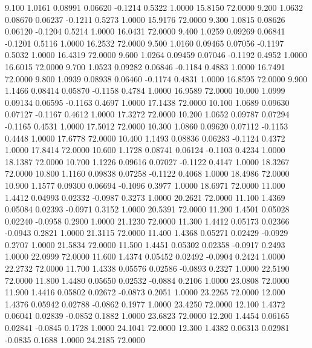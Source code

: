    9.100   1.0161   0.08991   0.06620  -0.1214   0.5322   1.0000  15.8150  72.0000
   9.200   1.0632   0.08670   0.06237  -0.1211   0.5273   1.0000  15.9176  72.0000
   9.300   1.0815   0.08626   0.06120  -0.1204   0.5214   1.0000  16.0431  72.0000
   9.400   1.0259   0.09269   0.06841  -0.1201   0.5116   1.0000  16.2532  72.0000
   9.500   1.0160   0.09465   0.07056  -0.1197   0.5032   1.0000  16.4319  72.0000
   9.600   1.0264   0.09459   0.07046  -0.1192   0.4952   1.0000  16.6015  72.0000
   9.700   1.0523   0.09282   0.06846  -0.1184   0.4883   1.0000  16.7491  72.0000
   9.800   1.0939   0.08938   0.06460  -0.1174   0.4831   1.0000  16.8595  72.0000
   9.900   1.1466   0.08414   0.05870  -0.1158   0.4784   1.0000  16.9589  72.0000
  10.000   1.0999   0.09134   0.06595  -0.1163   0.4697   1.0000  17.1438  72.0000
  10.100   1.0689   0.09630   0.07127  -0.1167   0.4612   1.0000  17.3272  72.0000
  10.200   1.0652   0.09787   0.07294  -0.1165   0.4531   1.0000  17.5012  72.0000
  10.300   1.0860   0.09620   0.07112  -0.1153   0.4448   1.0000  17.6778  72.0000
  10.400   1.1493   0.08836   0.06283  -0.1124   0.4372   1.0000  17.8414  72.0000
  10.600   1.1728   0.08741   0.06124  -0.1103   0.4234   1.0000  18.1387  72.0000
  10.700   1.1226   0.09616   0.07027  -0.1122   0.4147   1.0000  18.3267  72.0000
  10.800   1.1160   0.09838   0.07258  -0.1122   0.4068   1.0000  18.4986  72.0000
  10.900   1.1577   0.09300   0.06694  -0.1096   0.3977   1.0000  18.6971  72.0000
  11.000   1.4412   0.04993   0.02332  -0.0987   0.3273   1.0000  20.2621  72.0000
  11.100   1.4369   0.05084   0.02393  -0.0971   0.3152   1.0000  20.5391  72.0000
  11.200   1.4501   0.05028   0.02240  -0.0958   0.2900   1.0000  21.1230  72.0000
  11.300   1.4412   0.05173   0.02366  -0.0943   0.2821   1.0000  21.3115  72.0000
  11.400   1.4368   0.05271   0.02429  -0.0929   0.2707   1.0000  21.5834  72.0000
  11.500   1.4451   0.05302   0.02358  -0.0917   0.2493   1.0000  22.0999  72.0000
  11.600   1.4374   0.05452   0.02492  -0.0904   0.2424   1.0000  22.2732  72.0000
  11.700   1.4338   0.05576   0.02586  -0.0893   0.2327   1.0000  22.5190  72.0000
  11.800   1.4480   0.05650   0.02532  -0.0884   0.2106   1.0000  23.0808  72.0000
  11.900   1.4416   0.05802   0.02672  -0.0873   0.2051   1.0000  23.2265  72.0000
  12.000   1.4376   0.05942   0.02788  -0.0862   0.1977   1.0000  23.4250  72.0000
  12.100   1.4372   0.06041   0.02839  -0.0852   0.1882   1.0000  23.6823  72.0000
  12.200   1.4454   0.06165   0.02841  -0.0845   0.1728   1.0000  24.1041  72.0000
  12.300   1.4382   0.06313   0.02981  -0.0835   0.1688   1.0000  24.2185  72.0000

